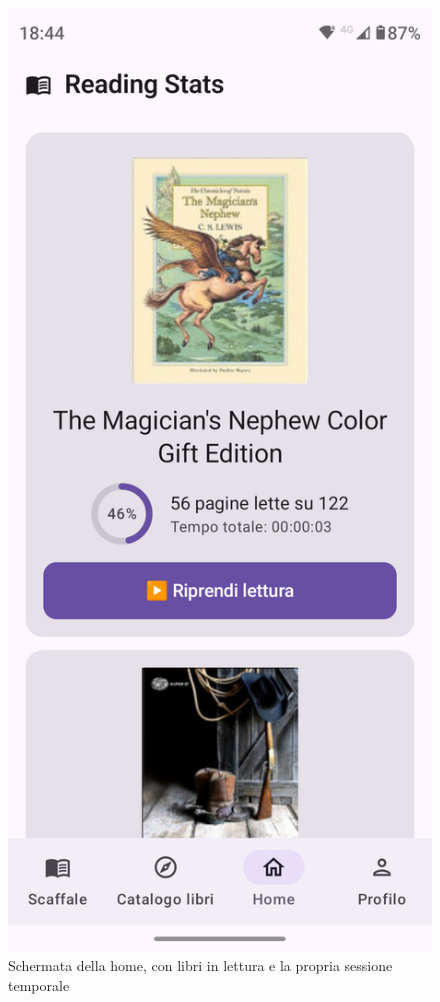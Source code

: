 \documentclass{article}
\begin{document}
\begin{figure}[H]
  \centering
  \includegraphics[width=0.6\linewidth]{home.png}
  \caption{Schermata della home, con libri in lettura e la propria sessione temporale}
  \label{fig:sitemap}
\end{figure}
\end{document}

